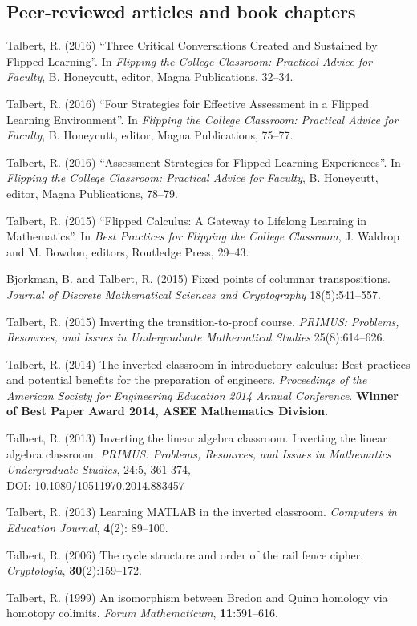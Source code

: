 \documentclass[letterpaper]{article}
\renewenvironment{itemize}{
  \begin{list}{}{
    \setlength{\leftmargin}{1.5em}
	\setlength{\itemsep}{0in}
  }
}{
  \end{list}
}
\begin{document}
\subsection*{Peer-reviewed articles and book chapters}

\begin{itemize}
\item Talbert, R. (2016) ``Three Critical Conversations Created and Sustained by Flipped Learning''. In \emph{Flipping the College Classroom: Practical Advice for Faculty}, B. Honeycutt, editor, Magna Publications, 32--34.
\item Talbert, R. (2016) ``Four Strategies foir Effective Assessment in a Flipped Learning Environment''. In \emph{Flipping the College Classroom: Practical Advice for Faculty}, B. Honeycutt, editor, Magna Publications, 75--77.
\item Talbert, R. (2016) ``Assessment Strategies for Flipped Learning Experiences''. In \emph{Flipping the College Classroom: Practical Advice for Faculty}, B. Honeycutt, editor, Magna Publications, 78--79.
\item Talbert, R. (2015) ``Flipped Calculus: A Gateway to Lifelong Learning in Mathematics''.  In \emph{Best Practices for Flipping the College Classroom}, J. Waldrop and M. Bowdon, editors, Routledge Press, 29--43.
\item Bjorkman, B. and Talbert, R. (2015) Fixed points of columnar transpositions. \emph{Journal of Discrete Mathematical Sciences and Cryptography} 18(5):541--557. 
\item Talbert, R. (2015) Inverting the transition-to-proof course. \emph{PRIMUS: Problems, Resources, and Issues in Undergraduate Mathematical Studies} 25(8):614--626. 
\item Talbert, R. (2014) The inverted classroom in introductory calculus: Best practices and potential benefits for the preparation of engineers. \emph{Proceedings of the American Society for Engineering Education 2014 Annual Conference}.  \textbf{Winner of Best Paper Award 2014, ASEE Mathematics Division.}
\item Talbert, R. (2013) Inverting the linear algebra classroom. Inverting the linear algebra classroom. \emph{PRIMUS: Problems, Resources, and Issues in Mathematics Undergraduate Studies}, 24:5, 361-374, \\ DOI: 10.1080/10511970.2014.883457
\item Talbert, R. (2013) Learning MATLAB in the inverted classroom. \emph{Computers in Education Journal}, \textbf{4}(2): 89--100.  
\item Talbert, R. (2006) The cycle structure and order of the rail fence cipher. \emph{Cryptologia}, \textbf{30}(2):159--172. 
\item Talbert, R. (1999) An isomorphism between Bredon and Quinn homology via homotopy colimits. \emph{Forum Mathematicum}, \textbf{11}:591--616. 
\end{itemize}
\end{document}
